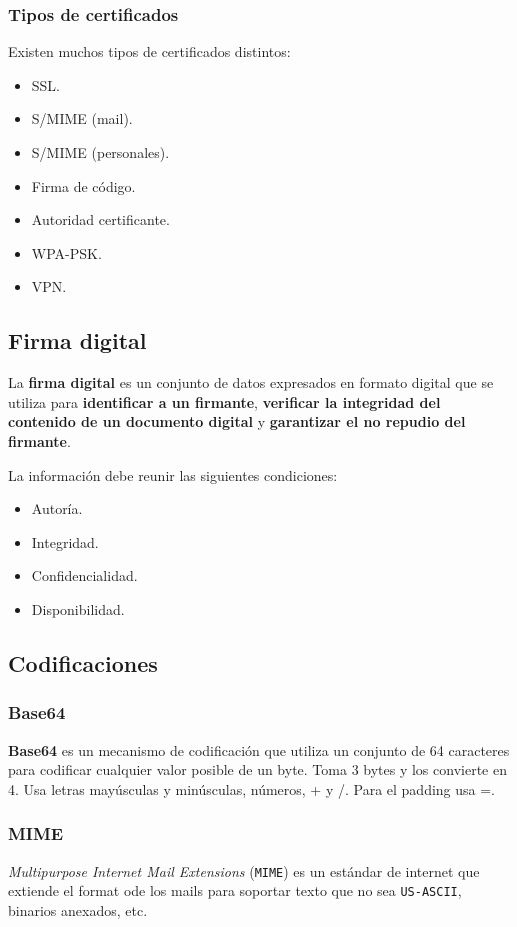 \subsubsection{Tipos de certificados}
Existen muchos tipos de certificados distintos:
\begin{itemize}
	\item SSL.
	\item S/MIME (mail).
	\item S/MIME (personales).
	\item Firma de código.
	\item Autoridad certificante.
	\item WPA-PSK.
	\item VPN.
\end{itemize}

\subsection{Firma digital}
La \textbf{firma digital} es un conjunto de datos expresados en formato digital que se utiliza para \textbf{identificar a un firmante}, \textbf{verificar la integridad del contenido de un documento digital} y \textbf{garantizar el no repudio del firmante}.

La información debe reunir las siguientes condiciones: 
\begin{itemize}
	\item Autoría.
	\item Integridad.
	\item Confidencialidad.
	\item Disponibilidad.
\end{itemize}

\subsection{Codificaciones}
\subsubsection{Base64}
\textbf{Base64} es un mecanismo de codificación que utiliza un conjunto de 64 caracteres para codificar cualquier valor posible de un byte. Toma 3 bytes y los convierte en 4. Usa letras mayúsculas y minúsculas, números, + y /. Para el padding usa =.

\subsubsection{MIME}
\emph{Multipurpose Internet Mail Extensions} (\texttt{MIME}) es un estándar de internet que extiende el format ode los mails para soportar texto que no sea \texttt{US-ASCII}, binarios anexados, etc. 

